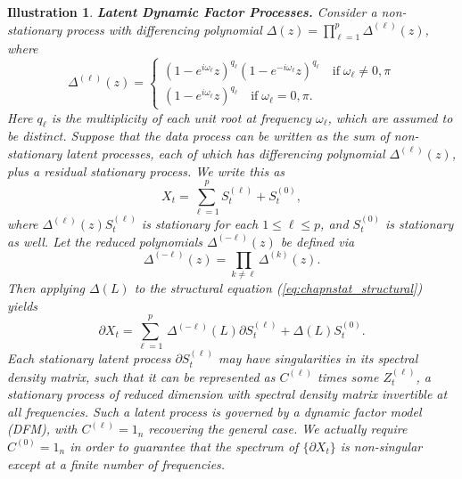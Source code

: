 \documentclass[a4paper]{book}
\newtheorem{Illustration}{Illustration}
\begin{document}
\begin{Illustration} {\bf Latent Dynamic Factor Processes.} \rm
\label{ill:dyn-fact}
 Consider a non-stationary process with differencing polynomial 
 $\Delta (z) = \prod_{\ell=1}^p \Delta^{(\ell)} (z)$, where
\[
  \Delta^{(\ell)} (z) = \begin{cases}
 {(1 - e^{i \omega_{\ell}} z )}^{q_{\ell}} {(1 - e^{-i \omega_{\ell}} z )}^{q_{\ell}}   
 \quad \mbox{if} \; \omega_{\ell} \neq 0, \pi \\
 {(1 - e^{i \omega_{\ell}} z )}^{q_{\ell}} \quad \mbox{if} \; \omega_{\ell} = 0, \pi.
 \end{cases}
\]
 Here $q_{\ell}$ is the  multiplicity of each unit root at 
  frequency $\omega_{\ell}$, which are assumed to be distinct.
Suppose that the data process can be written as the sum of
 non-stationary latent processes, each of which has differencing
 polynomial $\Delta^{(\ell)} (z)$, plus a
 residual stationary process.  We write this as
\begin{equation}
 \label{eq:chapnstat_structural}
 X_t = \sum_{\ell=1}^p S^{(\ell)}_t + S^{(0)}_t,
\end{equation}
 where $\Delta^{(\ell)} (z) S^{(\ell)}_t$ is
 stationary for each $1 \leq \ell \leq p$, and $S^{(0)}_t$ is
 stationary as well.  Let the
 reduced polynomials $\Delta^{(-\ell)} (z)$ be defined via
\[
  \Delta^{(-\ell)} (z) = \prod_{k \neq \ell} \Delta^{(k)} (z).
\]
  Then applying $\Delta (L)$ to the structural
  equation (\ref{eq:chapnstat_structural}) yields
\[
 \partial X_t   = \sum_{\ell=1}^p \, \Delta^{(-\ell)} (L) \partial
 S^{(\ell)}_t + \Delta (L) S^{(0)}_t.
\]
   Each stationary latent process $\partial S^{(\ell)}_t$ may have
  singularities in its spectral density matrix, such that it can be
  represented as $C^{(\ell)}$ times some $Z^{(\ell)}_t$, a
 stationary process of reduced dimension with spectral density
 matrix invertible at all frequencies.  Such a latent process is
 governed by a dynamic factor model (DFM), with $C^{(\ell)} =
 1_n$ recovering the general case.  We actually require
 $C^{(0)} = 1_n$ in order to guarantee that the spectrum of
 $\{ \partial X_t \}$ is non-singular except at a finite number of
 frequencies.


\end{Illustration}
\end{document}
